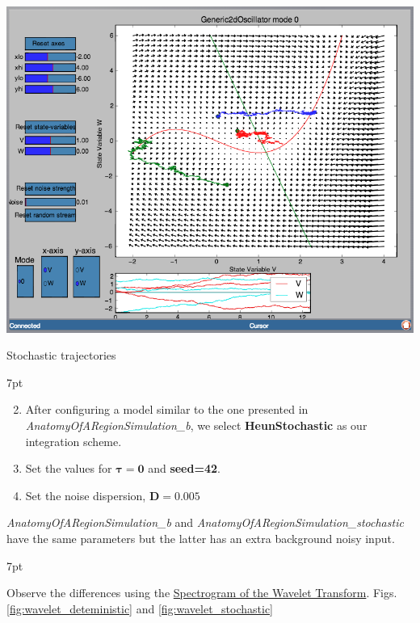 \documentclass{tufte-handout}
\newenvironment{formal}{%
  \def\FrameCommand{%
    \hspace{1pt}%
    {\color{DarkBlue}\vrule width 2pt}%
    {\color{formalshade}\vrule width 4pt}%
    \colorbox{formalshade}%
  }%
  \MakeFramed{\advance\hsize-\width\FrameRestore}%
  \noindent\hspace{-4.55pt}%
  \begin{adjustwidth}{}{7pt}%
  \vspace{2pt}\vspace{2pt}%
}
{%
  \vspace{2pt}\end{adjustwidth}\endMakeFramed%
}
\newenvironment{simulation}{%
  \def\FrameCommand{%
    \hspace{1pt}%
    {\color{ForestGreen}\vrule width 2pt}%
    {\color{simulationshade}\vrule width 4pt}%
    \colorbox{simulationshade}%
  }%
  \MakeFramed{\advance\hsize-\width\FrameRestore}%
  \noindent\hspace{-4.55pt}%
  \begin{adjustwidth}{}{7pt}%
  \vspace{2pt}\vspace{2pt}%
}
{%
  \vspace{2pt}\end{adjustwidth}\endMakeFramed%
}
\begin{document}
\begin{marginfigure}%
\includegraphics[width=\linewidth]{Handout_UI_BuildingYourOwnBrainNetworkModel_PPI}%
  \caption{Stochastic trajectories}%
  \label{fig:ppi_noise}%
\end{marginfigure}

\begin{simulation}
\begin{enumerate}[resume]
\setcounter{enumi}{1}
\item After configuring a model similar to the one presented in  \textit{AnatomyOfARegionSimulation\_b}, we select \textbf{HeunStochastic} as our integration scheme.  
\item Set the values for {$\boldsymbol{\tau=0}$}  and \textbf{seed=42}. 
\item Set the noise dispersion, $\mathbf{D=0.005}$
\end{enumerate}
\end{simulation}
\textit{AnatomyOfARegionSimulation\_b} and \textit{AnatomyOfARegionSimulation\_stochastic} have the same parameters but the latter has an extra background noisy input. 

\begin{formal}
\begin{enumerate}
Observe the differences using the \underline{Spectrogram of the Wavelet Transform}. Figs. \ref{fig:wavelet_deteministic} and \ref{fig:wavelet_stochastic}
\end{enumerate}
\end{formal}
\end{document}
